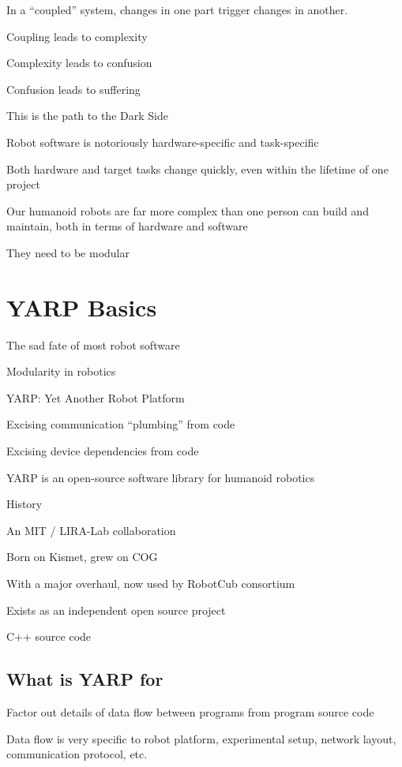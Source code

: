 In a ``coupled'' system, changes in one part trigger changes in another.

Coupling leads to complexity

Complexity leads to confusion

Confusion leads to suffering

This is the path to the Dark Side

Robot software is notoriously hardware-specific and task-specific

Both hardware and target tasks change quickly, even within the
lifetime of one project

Our humanoid robots are far more complex than one person can build and
maintain, both in terms of hardware and software

They need to be modular





\section{YARP Basics}


The sad fate of most robot software

Modularity in robotics

YARP: Yet Another Robot Platform

Excising communication ``plumbing'' from code

Excising device dependencies from code



YARP is an open-source software library  for humanoid robotics

History

An MIT / LIRA-Lab collaboration

Born on Kismet, grew on COG

With a major overhaul, now used by RobotCub consortium

Exists as an independent open source project

C++ source code



\subsection{What is YARP for}


Factor out details of data flow between programs from program source code

Data flow is very specific to robot platform, experimental setup,
network layout, communication protocol, etc.

